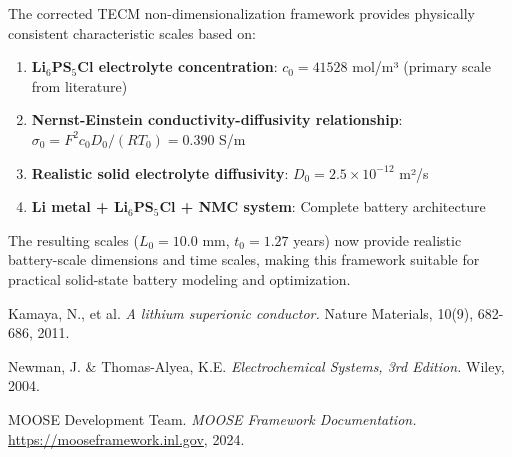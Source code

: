 \documentclass[11pt,a4paper]{article}
\begin{document}
The corrected TECM non-dimensionalization framework provides physically consistent characteristic scales based on:

\begin{enumerate}
    \item \textbf{Li$_6$PS$_5$Cl electrolyte concentration}: $c_0 = 41528$ mol/m³ (primary scale from literature)
    \item \textbf{Nernst-Einstein conductivity-diffusivity relationship}: $\sigma_0 = F^2c_0D_0/(RT_0) = 0.390$ S/m
    \item \textbf{Realistic solid electrolyte diffusivity}: $D_0 = 2.5 \times 10^{-12}$ m²/s
    \item \textbf{Li metal + Li$_6$PS$_5$Cl + NMC system}: Complete battery architecture
\end{enumerate}

The resulting scales ($L_0 = 10.0$ mm, $t_0 = 1.27$ years) now provide realistic battery-scale dimensions and time scales, making this framework suitable for practical solid-state battery modeling and optimization.

\begin{thebibliography}{9}

Kamaya, N., et al.
\textit{A lithium superionic conductor.}
Nature Materials, 10(9), 682-686, 2011.

Newman, J. \& Thomas-Alyea, K.E.
\textit{Electrochemical Systems, 3rd Edition.}
Wiley, 2004.

MOOSE Development Team.
\textit{MOOSE Framework Documentation.}
\url{https://mooseframework.inl.gov}, 2024.

\end{thebibliography}
\end{document}
